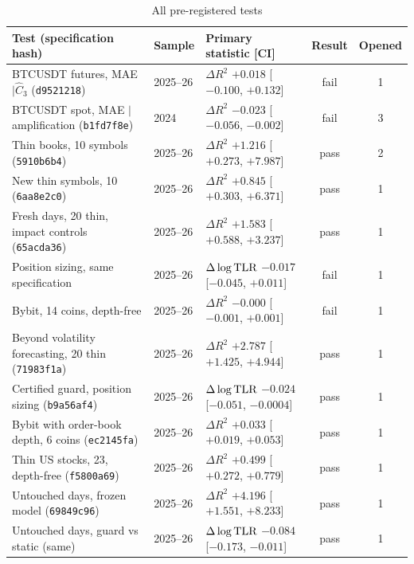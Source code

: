 \documentclass[12pt]{article}
\theoremstyle{definition}
\theoremstyle{remark}
\begin{document}
\begin{table}[!htbp]\centering\footnotesize\renewcommand{\arraystretch}{0.80}\setlength{\abovecaptionskip}{3pt}
\begin{threeparttable}
\caption{All pre-registered tests}\label{tab:alltests}
\setlength{\tabcolsep}{3pt}
\begin{tabular}{p{}lp{}cc}
\toprule
Test (specification hash) & Sample & Primary statistic [CI] & Result & Opened\\
\midrule
BTCUSDT futures, MAE $\mid\hat C_3$ (\texttt{d9521218}) & 2025--26 & $\Delta R^2$ $+0.018$ [$-0.100$, $+0.132$] & fail & 1\\
BTCUSDT spot, MAE $\mid$ amplification (\texttt{b1fd7f8e}) & 2024 & $\Delta R^2$ $-0.023$ [$-0.056$, $-0.002$] & fail & 3\\
Thin books, 10 symbols (\texttt{5910b6b4}) & 2025--26 & $\Delta R^2$ $+1.216$ [$+0.273$, $+7.987$] & pass & 2\\
New thin symbols, 10 (\texttt{6aa8e2c0}) & 2025--26 & $\Delta R^2$ $+0.845$ [$+0.303$, $+6.371$] & pass & 1\\
Fresh days, 20 thin, impact controls (\texttt{65acda36}) & 2025--26 & $\Delta R^2$ $+1.583$ [$+0.588$, $+3.237$] & pass & 1\\
Position sizing, same specification & 2025--26 & $\Delta\log{\rm TLR}$ $-0.017$ [$-0.045$, $+0.011$] & fail & 1\\
Bybit, 14 coins, depth-free & 2025--26 & $\Delta R^2$ $-0.000$ [$-0.001$, $+0.001$] & fail & 1\\
Beyond volatility forecasting, 20 thin (\texttt{71983f1a}) & 2025--26 & $\Delta R^2$ $+2.787$ [$+1.425$, $+4.944$] & pass & 1\\
Certified guard, position sizing (\texttt{b9a56af4}) & 2025--26 & $\Delta\log{\rm TLR}$ $-0.024$ [$-0.051$, $-0.0004$] & pass & 1\\
Bybit with order-book depth, 6 coins (\texttt{ec2145fa}) & 2025--26 & $\Delta R^2$ $+0.033$ [$+0.019$, $+0.053$] & pass & 1\\
Thin US stocks, 23, depth-free (\texttt{f5800a69}) & 2025--26 & $\Delta R^2$ $+0.499$ [$+0.272$, $+0.779$] & pass & 1\\
Untouched days, frozen model (\texttt{69849c96}) & 2025--26 & $\Delta R^2$ $+4.196$ [$+1.551$, $+8.233$] & pass & 1\\
Untouched days, guard vs static (same) & 2025--26 & $\Delta\log{\rm TLR}$ $-0.084$ [$-0.173$, $-0.011$] & pass & 1\\

\end{tabular}
\end{threeparttable}
\end{table}
\end{document}
